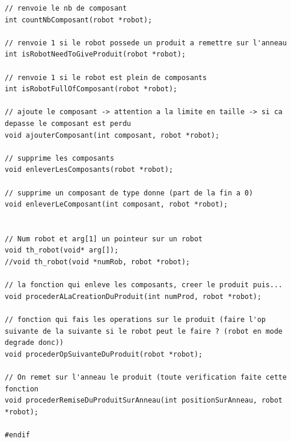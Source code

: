 \documentclass{report}
\begin{document}
\begin{lstlisting}[caption=Représentation des robots]
// renvoie le nb de composant
int countNbComposant(robot *robot);

// renvoie 1 si le robot possede un produit a remettre sur l'anneau
int isRobotNeedToGiveProduit(robot *robot);

// renvoie 1 si le robot est plein de composants
int isRobotFullOfComposant(robot *robot);

// ajoute le composant -> attention a la limite en taille -> si ca depasse le composant est perdu
void ajouterComposant(int composant, robot *robot);

// supprime les composants
void enleverLesComposants(robot *robot);

// supprime un composant de type donne (part de la fin a 0)
void enleverLeComposant(int composant, robot *robot);


// Num robot et arg[1] un pointeur sur un robot
void th_robot(void* arg[]);
//void th_robot(void *numRob, robot *robot);

// la fonction qui enleve les composants, creer le produit puis...
void procederALaCreationDuProduit(int numProd, robot *robot);

// fonction qui fais les operations sur le produit (faire l'op suivante de la suivante si le robot peut le faire ? (robot en mode degrade donc))
void procederOpSuivanteDuProduit(robot *robot);

// On remet sur l'anneau le produit (toute verification faite cette fonction
void procederRemiseDuProduitSurAnneau(int positionSurAnneau, robot *robot);

#endif
\end{lstlisting}
\end{document}
